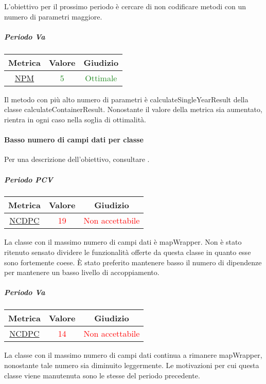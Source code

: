 			L'obiettivo per il prossimo periodo è cercare di non codificare metodi con un numero di parametri maggiore.
			
			\subparagraph{Periodo Va}
			
			\begin{table}[H]
				\centering
				\begin{tabular}{  c | c | c}
					\hline
					\textbf{Metrica} & \textbf{Valore} & \textbf{Giudizio} \\
					\hline
					\hyperref[MMC]{NPM}   & \textcolor{ForestGreen}{5}          & \textcolor{ForestGreen}{Ottimale}  \\ \hline
				\end{tabular} 
			\end{table}
			Il metodo con più alto numero di parametri è calculateSingleYearResult della classe calculateContainerResult. Nonostante il valore della metrica sia aumentato, rientra in ogni caso nella soglia di ottimalità.
			
			\newpage
			\paragraph{Basso numero di campi dati per classe}
			Per una descrizione dell'obiettivo, consultare .
				\subparagraph{Periodo PCV}
				
				\begin{table}[H]
					\centering
					\begin{tabular}{  c | c | c}
						\hline
						\textbf{Metrica} & \textbf{Valore} & \textbf{Giudizio} \\
						\hline
						\hyperref[MMC]{NCDPC}   & \textcolor{Red}{19}          & \textcolor{Red}{Non accettabile}  \\ \hline
					\end{tabular} 
				\end{table}
				La classe con il massimo numero di campi dati è mapWrapper. Non è stato ritenuto sensato dividere le funzionalità offerte da questa classe in quanto esse sono fortemente coese. È stato preferito mantenere basso il numero di dipendenze per mantenere un basso livello di accoppiamento.
				
				\subparagraph{Periodo Va}
				
				\begin{table}[H]
					\centering
					\begin{tabular}{  c | c | c}
						\hline
						\textbf{Metrica} & \textbf{Valore} & \textbf{Giudizio} \\
						\hline
						\hyperref[MMC]{NCDPC}   & \textcolor{Red}{14}          & \textcolor{Red}{Non accettabile}  \\ \hline
					\end{tabular} 
				\end{table}
				La classe con il massimo numero di campi dati continua a rimanere mapWrapper, nonostante tale numero sia diminuito leggermente. Le motivazioni per cui questa classe viene manutenuta sono le stesse del periodo precedente.
				
